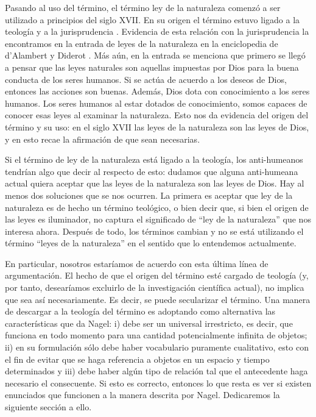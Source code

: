 Pasando al uso del término, el término ley de la naturaleza comenzó a ser utilizado a principios del siglo XVII. En su origen el término estuvo ligado a la teología y a la jurisprudencia \cite{Giere2006, Giere1999}. Evidencia de esta relación con la jurisprudencia la encontramos en la entrada de leyes de la naturaleza en la enciclopedia de d'Alambert y Diderot \cite{lawna}. Más aún, en la entrada se menciona que primero se llegó a pensar que las leyes naturales son aquellas impuestas por Dios para la buena conducta de los seres humanos. Si se actúa de acuerdo a los deseos de Dios, entonces las acciones son buenas. Además, Dios dota con conocimiento a los seres humanos. Los seres humanos al estar dotados de conocimiento, somos capaces de conocer esas leyes al examinar la naturaleza. Esto nos da evidencia del origen del término y su uso: en el siglo XVII las leyes de la naturaleza son las leyes de Dios, y en esto recae la afirmación de que sean necesarias.

Si el término de ley de la naturaleza está ligado a la teología, los anti-humeanos tendrían algo que decir al respecto de esto: dudamos que alguna anti-humeana actual quiera aceptar que las leyes de la naturaleza son las leyes de Dios. Hay al menos dos soluciones que se nos ocurren. La primera es aceptar que ley de la naturaleza es de hecho un término teológico, o bien decir que, si bien el origen de las leyes es iluminador, no captura el significado de ``ley de la naturaleza'' que nos interesa ahora. Después de todo, los términos cambian y no se está utilizando el término ``leyes de la naturaleza'' en el sentido que lo entendemos actualmente.

En particular, nosotros estaríamos de acuerdo con esta última línea de argumentación. El hecho de que el origen del término esté cargado de teología (y, por tanto, desearíamos excluirlo de la investigación científica actual), no implica que sea así necesariamente. Es decir, se puede secularizar el término. Una manera de descargar a la teología del término es adoptando como alternativa las características que da Nagel: i) debe ser un universal irrestricto, es decir, que funciona en todo momento para una cantidad potencialmente infinita de objetos; ii) en su formulación sólo debe haber vocabulario puramente cualitativo, esto con el fin de evitar que se haga referencia a objetos en un espacio y tiempo determinados y iii) debe haber algún tipo de relación tal que el antecedente haga necesario el consecuente. Si esto es correcto, entonces lo que resta es ver si existen enunciados que funcionen a la manera descrita por Nagel. Dedicaremos la siguiente sección a ello.


